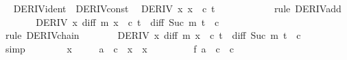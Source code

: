 \begin{isabellebody}
\ \isamarkupfalse%
\ DERIV{\isacharunderscore}{\kern0pt}ident\ \ DERIV{\isacharunderscore}{\kern0pt}const\ \isamarkupfalse%
\ {\isachardoublequoteopen}DERIV\ {\isacharparenleft}{\kern0pt}{\isasymlambda}x{\isachardot}{\kern0pt}\ x\ {\isacharplus}{\kern0pt}\ c{\isacharparenright}{\kern0pt}\ t\ {\isacharcolon}{\kern0pt}{\isachargreater}{\kern0pt}\ {}\ {\isacharplus}{\kern0pt}\ {}{\isachardoublequoteclose}\isanewline
\ \ \ \ \ \ \isamarkupfalse%
\ {\isacharparenleft}{\kern0pt}rule\ DERIV{\isacharunderscore}{\kern0pt}add{\isacharparenright}{\kern0pt}\isanewline
\ \ \ \ \isamarkupfalse%
\ \isamarkupfalse%
\ {\isachardoublequoteopen}DERIV\ {\isacharparenleft}{\kern0pt}{\isasymlambda}x{\isachardot}{\kern0pt}\ diff\ m\ {\isacharparenleft}{\kern0pt}x\ {\isacharplus}{\kern0pt}\ c{\isacharparenright}{\kern0pt}{\isacharparenright}{\kern0pt}\ t\ {\isacharcolon}{\kern0pt}{\isachargreater}{\kern0pt}\ diff\ {\isacharparenleft}{\kern0pt}Suc\ m{\isacharparenright}{\kern0pt}\ {\isacharparenleft}{\kern0pt}t\ {\isacharplus}{\kern0pt}\ c{\isacharparenright}{\kern0pt}\ {\isacharasterisk}{\kern0pt}\ {\isacharparenleft}{\kern0pt}{}\ {\isacharplus}{\kern0pt}\ {}{\isacharparenright}{\kern0pt}{\isachardoublequoteclose}\isanewline
\ \ \ \ \ \ \isamarkupfalse%
\ {\isacharparenleft}{\kern0pt}rule\ DERIV{\isacharunderscore}{\kern0pt}chain{}{\isacharparenright}{\kern0pt}\isanewline
\ \ \ \ \isamarkupfalse%
\ \isamarkupfalse%
\ {\isachardoublequoteopen}DERIV\ {\isacharparenleft}{\kern0pt}{\isasymlambda}x{\isachardot}{\kern0pt}\ diff\ m\ {\isacharparenleft}{\kern0pt}x\ {\isacharplus}{\kern0pt}\ c{\isacharparenright}{\kern0pt}{\isacharparenright}{\kern0pt}\ t\ {\isacharcolon}{\kern0pt}{\isachargreater}{\kern0pt}\ diff\ {\isacharparenleft}{\kern0pt}Suc\ m{\isacharparenright}{\kern0pt}\ {\isacharparenleft}{\kern0pt}t\ {\isacharplus}{\kern0pt}\ c{\isacharparenright}{\kern0pt}{\isachardoublequoteclose}\isanewline
\ \ \ \ \ \ \isamarkupfalse%
\ simp\isanewline
\ \ \isamarkupfalse%
\isanewline
\ \ \isamarkupfalse%
\ \isamarkupfalse%
\ x\ \isanewline
\ \ \ \ {\isachardoublequoteopen}a\ {\isacharminus}{\kern0pt}\ c\ {\isacharless}{\kern0pt}\ x\ {\isasymand}\ x\ {\isacharless}{\kern0pt}\ {}\ {\isasymand}\isanewline
\ \ \ \ \ \ f\ {\isacharparenleft}{\kern0pt}a\ {\isacharminus}{\kern0pt}\ c\ {\isacharplus}{\kern0pt}\ c{\isacharparenright}{\kern0pt}\ {\isacharequal}{\kern0pt}\isanewline

\end{isabellebody}
